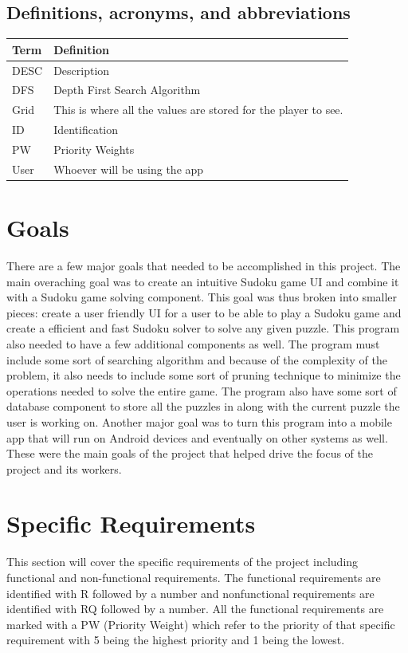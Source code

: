 \documentclass{article}
\begin{document}
\subsection{Definitions, acronyms, and abbreviations}

\begin{tabular}{ | m{8em} | m{24em}|  } 
\hline
\textbf{Term}& \textbf{Definition}  \\ 
\hline
DESC & Description  \\ 
\hline
DFS & Depth First Search Algorithm\\
\hline
Grid & This is where all the values are stored for the player to see.  \\ 
\hline
ID & Identification  \\ 
\hline
PW & Priority Weights  \\ 
\hline
User & Whoever will be using the app  \\ 
\hline
\end{tabular}

 

\section{Goals}
There are a few major goals that needed to be accomplished in this project. The main overaching goal was to create an intuitive Sudoku game UI and combine it with a Sudoku game solving component. This goal was thus broken into smaller pieces: create a user friendly UI for a user to be able to play a Sudoku game and create a efficient and fast Sudoku solver to solve any given puzzle. This program also needed to have a few additional components as well. The program must include some sort of searching algorithm and because of the complexity of the problem, it also needs to include some sort of pruning technique to minimize the operations needed to solve the entire game. The program also have some sort of database component to store all the puzzles in along with the current puzzle the user is working on. Another major goal was to turn this program into a mobile app that will run on Android devices and eventually on other systems as well. These were the main goals of the project that helped drive the focus of the project and its workers.

 
\section{Specific Requirements}
This section will cover the specific requirements of the project including functional and non-functional requirements. The functional requirements are identified with R followed by a number and nonfunctional requirements are identified with RQ followed by a number. All the functional requirements are marked with a PW (Priority Weight) which refer to the priority of that specific requirement with 5 being the highest priority and 1 being the lowest.
\end{document}
